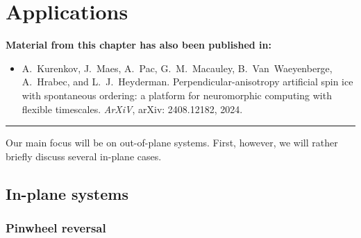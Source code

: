 \chapter{Applications}\label{ch:Applications}

\begin{adjustwidth}{2em}{2em} %
	\begin{center}
		\textbf{Material from this chapter has also been published in:} \\
	\end{center}
	\vspace{1em}
	\begin{adjustwidth}{0em}{1.5em}
		\begin{itemize}
			\item[\cite{KUR-24}] A.~Kurenkov, J.~Maes, A.~Pac, G.~M.~Macauley, B.~Van~Waeyenberge, A.~Hrabec, and L.~J.~Heyderman.
			\newblock Perpendicular-anisotropy artificial spin ice with spontaneous ordering: a platform for neuromorphic computing with flexible timescales.
			\newblock \emph{ArXiV}, arXiv: 2408.12182, 2024.
		\end{itemize}
	\end{adjustwidth}
	\vspace{.5em}
	\begin{center}
		\centering\rule{0.7\linewidth}{0.4pt}
	\end{center}
	\vspace{1em}
\end{adjustwidth}

Our main focus will be on out-of-plane systems. First, however, we will rather briefly discuss several in-plane cases.

\section{In-plane systems}
\subsection{Pinwheel reversal}\label{sec:3:IP_Pinwheel_reversal}
